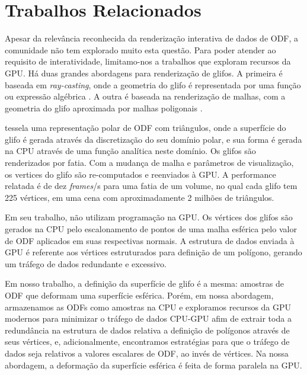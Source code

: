 
\section{Trabalhos Relacionados}
\label{sec::trabalhos_relacionados}

Apesar da relevância reconhecida da renderização interativa de dados de ODF, a comunidade não tem explorado muito esta questão. Para poder atender ao requisito de interatividade, limitamo-nos a trabalhos que exploram recursos da GPU. Há duas grandes abordagens para renderização de glifos. A primeira é baseada em \textit{ray-casting}, onde a geometria do glifo é representada por uma função ou expressão algébrica \cite{peeters2009, almsick2011}. A outra é baseada na renderização de malhas, com a geometria do glifo aproximada por malhas poligonais \cite{shattuck2008}.


 tessela uma representação polar de ODF com triângulos, onde a superfície do glifo é gerada através da discretização do seu domínio polar, e sua forma é gerada na CPU através de uma função analítica neste domínio. Os glifos são renderizados por fatia. Com a mudança de malha e parâmetros de visualização, os vertices do glifo são re-computados e reenviados à GPU. A performance relatada é de dez \textit{frames}/s para uma fatia de um volume, no qual cada glifo tem 225 vértices, em uma cena com aproximadamente 2 milhões de triângulos. 

Em seu trabalho,  não utilizam programação na GPU. Os vértices dos glifos são gerados na CPU pelo escalonamento de pontos de uma malha esférica pelo valor de ODF aplicados em suas respectivas normais. A estrutura de dados enviada à GPU é referente aos vértices estruturados para definição de um polígono, gerando um tráfego de dados redundante e excessivo.

Em nosso trabalho, a definição da superfície de glifo é a mesma: amostras de ODF que deformam uma superfície esférica. Porém, em nossa abordagem, armazenamos as ODFs como amostras na CPU e exploramos recursos da GPU modernos para minimizar o tráfego de dados CPU-GPU afim de extrair toda a redundância na estrutura de dados relativa a definição de polígonos através de seus vértices, e, adicionalmente, encontramos estratégias para que o tráfego de dados seja relativos a valores escalares de ODF, ao invés de vértices. Na nossa abordagem, a deformação da superfície esférica é feita de forma paralela na GPU.



